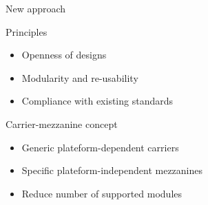 \documentclass[compress,red]{beamer}
\begin{document}
\begin{frame}{New approach}

  \begin{block}{Principles}
    \begin{itemize}
    \item Openness of designs
    \item Modularity and re-usability
    \item Compliance with existing standards
    \end{itemize}
  \end{block}

  \begin{block}{Carrier-mezzanine concept}
    \begin{itemize}
    \item Generic plateform-dependent carriers
    \item Specific plateform-independent mezzanines
    \item Reduce number of supported modules
    \end{itemize}
  \end{block}



\end{frame}
\end{document}
